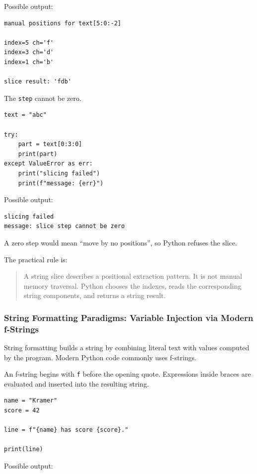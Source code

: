 Possible output:

\begin{verbatim}
manual positions for text[5:0:-2]

index=5 ch='f'
index=3 ch='d'
index=1 ch='b'

slice result: 'fdb'
\end{verbatim}

The \texttt{step} cannot be zero.

\begin{verbatim}
text = "abc"

try:
    part = text[0:3:0]
    print(part)
except ValueError as err:
    print("slicing failed")
    print(f"message: {err}")
\end{verbatim}

Possible output:

\begin{verbatim}
slicing failed
message: slice step cannot be zero
\end{verbatim}

A zero step would mean ``move by no positions'', so Python refuses the slice.

The practical rule is:

\begin{quote}
A string slice describes a positional extraction pattern. It is not manual memory traversal. Python chooses the indexes, reads the corresponding string components, and returns a string result.
\end{quote}

\subsubsection{String Formatting Paradigms: Variable Injection via Modern f-Strings}

String formatting builds a string by combining literal text with values computed by the program. Modern Python code commonly uses f-strings.

An f-string begins with \texttt{f} before the opening quote. Expressions inside braces are evaluated and inserted into the resulting string.

\begin{verbatim}
name = "Kramer"
score = 42

line = f"{name} has score {score}."

print(line)
\end{verbatim}

Possible output:

